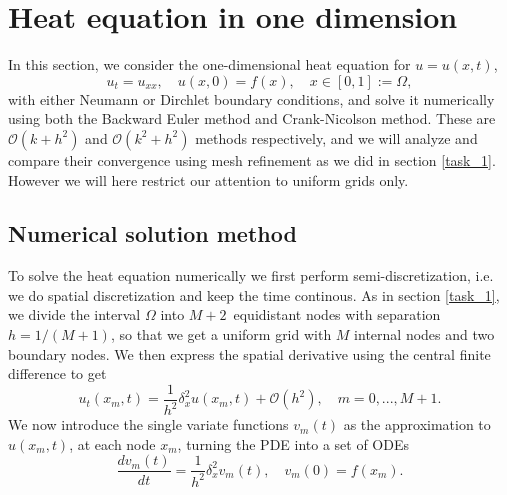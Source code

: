 \section{Heat equation in one dimension}
\label{heat-equation}
In this section, we consider the one-dimensional heat equation for $u = u(x, t)$, 
\begin{equation*}
    u_t = u_{xx}, \quad u(x, 0) = f(x), \quad x \in [0,1] := \Omega, 
    \label{eq:heat-eq}
\end{equation*}
with either Neumann or Dirchlet boundary conditions, 
and solve it numerically using both the Backward Euler method and Crank-Nicolson method. 
These are $\mathcal{O}(k+h^2)$ and $\mathcal{O}(k^2+h^2)$ methods respectively, 
and we will analyze and compare their convergence using mesh refinement as we did in section \ref{task_1}. However we will here restrict our attention to uniform grids only. 

\subsection{Numerical solution method}
To solve the heat equation numerically we first perform semi-discretization, 
i.e. we do spatial discretization and keep the time continous. 
As in section \ref{task_1}, 
we divide the interval $\Omega$ into $M+2$ equidistant nodes with separation $h=1/(M+1)$, 
so that we get a uniform grid with $M$ internal nodes and two boundary nodes. 
We then express the spatial derivative using the central finite difference to get 
\begin{equation*}
    u_t(x_m, t) = \frac{1}{h^2} \delta_x^2 u(x_m, t) + \mathcal{O}(h^2), 
    \quad m = 0,...,M+1.
\end{equation*}
We now introduce the single variate functions $v_m(t)$ as the approximation to $u(x_m, t)$, 
at each node $x_m$, 
turning the PDE into a set of ODEs 
\begin{equation*}
    \frac{dv_m(t)}{dt} = \frac{1}{h^2} \delta_x^2 v_m(t), 
    \quad v_m(0) = f(x_m). 
\end{equation*}

